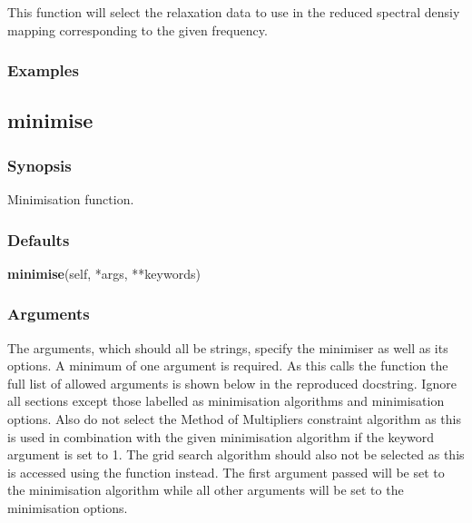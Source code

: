This function will select the relaxation data to use in the reduced spectral densiy mapping
corresponding to the given frequency.


\subsubsection{Examples}





\newpage

\subsection{minimise}


\subsubsection{Synopsis}

Minimisation function.

\subsubsection{Defaults}

\textsf{\textbf{minimise}(self, *args, **keywords)}


\subsubsection{Arguments}

The arguments, which should all be strings, specify the minimiser as well as its options.  A
minimum of one argument is required.  As this calls the function 
 the full
list of allowed arguments is shown below in the reproduced 
 docstring.
Ignore all sections except those labelled as minimisation algorithms and minimisation
options.  Also do not select the Method of Multipliers constraint algorithm as this is used
in combination with the given minimisation algorithm if the keyword argument 
is set to 1.  The grid search algorithm should also not be selected as this is accessed
using the 
 function instead.  The first argument passed will be set to the
minimisation algorithm while all other arguments will be set to the minimisation options.

